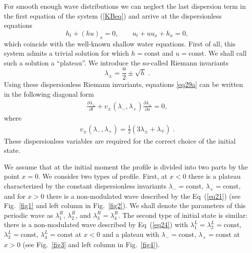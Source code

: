 \documentclass[pre,aps,superscriptaddress,twocolumn,floatfix]{revtex4-1}
\newcommand{\prt}{\partial}
\newcommand{\la}{\lambda}
\begin{document}
For smooth enough wave distributions we can neglect the last dispersion term in
the first equation of the system (\ref{KBeq}) and arrive at the
dispersionless equations
\begin{equation}\label{eq29a}
h_t+(hu)_x=0,\qquad u_t+uu_x+h_x=0,
\end{equation}
which coincide with the well-known shallow water equations. First of all, this system
admits a trivial solution for which $h = \mathrm{const}$ and $u = \mathrm{const}$.
We shall call such a solution a ``plateau''. We introduce the so-called Riemann invariants
\begin{equation}\label{eq31a}
\la_{\pm}=\frac{u}2\pm\sqrt{h}\;.
\end{equation}
Using these dispersionless Riemann invariants, equations \eqref{eq29a} can be
written in the following diagonal form
\begin{equation}\label{eq30a}
\begin{split}
\frac{\prt\la_{\pm}}{\prt t}+v_\pm(\la_-,\la_+)\frac{\prt\la_\pm}{\prt x}=0,
\end{split}
\end{equation}
where
\begin{equation}\label{eq30b}
\begin{split}
v_\pm(\la_-,\la_+)=\frac12(3\la_\pm+\la_\mp)\; .
\end{split}
\end{equation}
These dispersionless variables are required for the correct choice of the initial state.

We assume that at the initial moment the profile is divided into two parts by the point $x = 0$.
We consider two types of profile. First, at $x <0$ there is a plateau characterized
by the constant dispersionless invariants $\la_-=\mathrm{const}$, $\la_+=\mathrm{const}$,
and for $x> 0$ there is a non-modulated wave described by the Eq~(\ref{eq21})
(see Fig.~\ref{fig1} and left column in Fig.~\ref{fig2}). We shall denote the parameters
of this periodic wave as $\la_1^R$,  $\la_2^R$, and  $\la_3^R=\la_4^R$. The second type of
initial state is similar: there is a non-modulated wave described by Eq~(\ref{eq24})
with $\la_1^L=\la_2^L=\mathrm{const}$, $\la_3^L=\mathrm{const}$,  $\la_4^L=\mathrm{const}$
at $x <0$ and a plateau with $\la_-=\mathrm{const}$, $\la_+=\mathrm{const}$ at $x>0$
(see Fig.~\ref{fig3} and left column in Fig.~\ref{fig4}).
\end{document}
